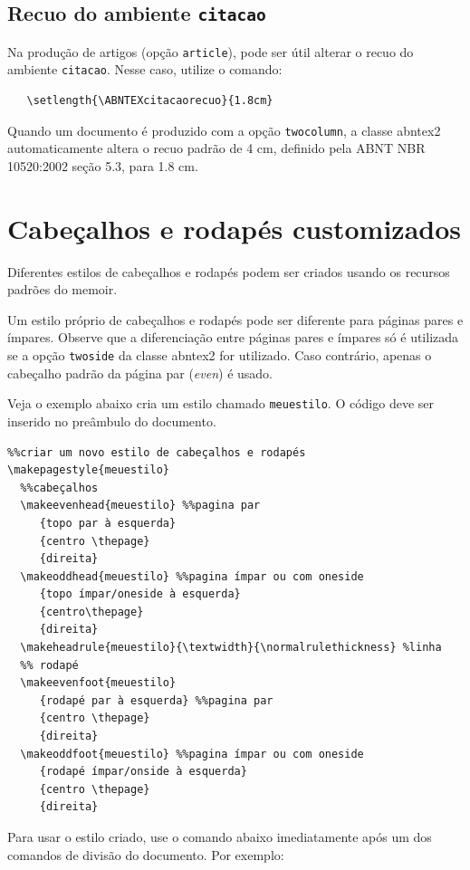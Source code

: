 \subsection{Recuo do ambiente \texttt{citacao}}

Na produção de artigos (opção \texttt{article}), pode ser útil alterar o recuo
do ambiente \texttt{citacao}. Nesse caso, utilize o comando:

\begin{verbatim}
   \setlength{\ABNTEXcitacaorecuo}{1.8cm}
\end{verbatim}

Quando um documento é produzido com a opção \texttt{twocolumn}, a classe
\textsf{abntex2} automaticamente altera o recuo padrão de 4 cm, definido pela
ABNT NBR 10520:2002 seção 5.3, para 1.8 cm.

\section{Cabeçalhos e rodapés customizados}

Diferentes estilos de cabeçalhos e rodapés podem ser criados usando os
recursos padrões do \textsf{memoir}.

Um estilo próprio de cabeçalhos e rodapés pode ser diferente para páginas pares
e ímpares. Observe que a diferenciação entre páginas pares e ímpares só é
utilizada se a opção \texttt{twoside} da classe \textsf{abntex2} for utilizado.
Caso contrário, apenas o cabeçalho padrão da página par (\emph{even}) é usado.

Veja o exemplo abaixo cria um estilo chamado \texttt{meuestilo}. O código deve
ser inserido no preâmbulo do documento.

\begin{verbatim}
%%criar um novo estilo de cabeçalhos e rodapés
\makepagestyle{meuestilo}
  %%cabeçalhos
  \makeevenhead{meuestilo} %%pagina par
     {topo par à esquerda}
     {centro \thepage}
     {direita}
  \makeoddhead{meuestilo} %%pagina ímpar ou com oneside
     {topo ímpar/oneside à esquerda}
     {centro\thepage}
     {direita}
  \makeheadrule{meuestilo}{\textwidth}{\normalrulethickness} %linha
  %% rodapé
  \makeevenfoot{meuestilo}
     {rodapé par à esquerda} %%pagina par
     {centro \thepage}
     {direita} 
  \makeoddfoot{meuestilo} %%pagina ímpar ou com oneside
     {rodapé ímpar/onside à esquerda}
     {centro \thepage}
     {direita}
\end{verbatim}

Para usar o estilo criado, use o comando abaixo imediatamente após um dos
comandos de divisão do documento. Por exemplo:

